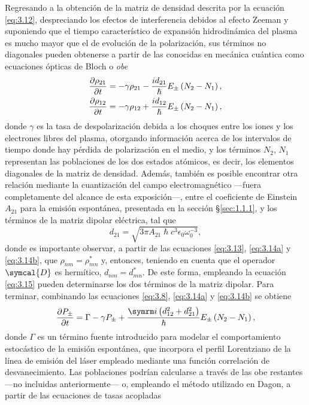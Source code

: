 Regresando a la obtención de la matriz de densidad descrita por la ecuación \eqref{eq:3.12}, despreciando los efectos de interferencia debidos al efecto Zeeman \autocite{Sureau1995} y suponiendo que el tiempo característico de expansión hidrodinámica del plasma es mucho mayor que el de evolución de la polarización, sus términos no diagonales pueden obtenerse a partir de las conocidas en mecánica cuántica \autocite{Milonni1988} como ecuaciones ópticas de Bloch o \emph{\acrfull{obe}}
\begin{align}
  \label{eq:3.14a}
  \frac{\partial\rho_{21}}{\partial t} &= -\gamma \rho_{21} - \frac{id_{21}}{\hslash }E_{\pm }\left(N_{2}-N_{1}\right), \\
  \label{eq:3.14b}
  \frac{\partial\rho_{12}}{\partial t} &= -\gamma \rho_{12} + \frac{id_{12}}{\hslash }E_{\pm }\left(N_{2}-N_{1}\right),
\end{align}
donde $\gamma$ es la tasa de despolarización debida a los choques entre los iones y los electrones libres del plasma, otorgando información acerca de los intervalos de tiempo donde hay pérdida de polarización en el medio, y los términos $N_{2}$, $N_{1}$ representan las poblaciones de los dos estados atómicos, es decir, los elementos diagonales de la matriz de densidad. Además, también es posible encontrar otra relación mediante la cuantización del campo electromagnético \autocite{Cohen-Tannoudji2019b} ---fuera completamente del alcance de esta exposición---, entre el coeficiente de Einstein $A_{21}$ para la emisión espontánea, presentada en la sección \S\ref{sec:1.1.1}, y los términos de la matriz dipolar eléctrica, tal que 
\begin{equation}\label{eq:3.15}
  d_{21} = \sqrt{3 \pi A_{21} \hslash c^{3} \epsilon_{0}\omega^{-3}_{0}}, 
\end{equation}
donde es importante observar, a partir de las ecuaciones \eqref{eq:3.13}, \eqref{eq:3.14a} y \eqref{eq:3.14b}, que $\rho_{nm} = \rho^{*}_{mn}$ y, entonces, teniendo en cuenta que el operador $\symcal{D}$ es hermítico, $d_{nm} = d^{*}_{mn}$. De este forma, empleando la ecuación \eqref{eq:3.15} pueden determinarse los dos términos de la matriz dipolar.
Para terminar, combinando las ecuaciones \eqref{eq:3.8}, \eqref{eq:3.14a} y \eqref{eq:3.14b} se obtiene 
\begin{equation}\label{eq:3.16}
  \pdv{P_{\pm }}{t} = \Gamma - \gamma P_{\pm } + \frac{\iu \left(d^{2}_{12} + d^{2}_{21}\right)}{\hslash }E_{\pm }\left(N_{2}-N_{1}\right),
\end{equation}
donde $\Gamma$ es un término fuente introducido \autocite{Oliva2012} para modelar el comportamiento estocástico de la emisión espontánea, que incorpora el perfil Lorentziano de la línea de emisión del láser empleado mediante una función correlación de desvanecimiento. Las poblaciones podrían calcularse a través de las \acrshort{obe} restantes ---no incluidas anteriormente--- o, empleando el método utilizado en Dagon, a partir de las ecuaciones de tasas acopladas 
